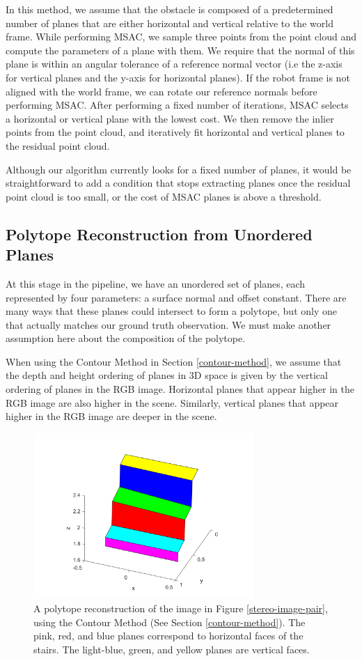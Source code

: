 In this method, we assume that the obstacle is composed of a predetermined number of planes that are either horizontal and vertical relative to the world frame. While performing MSAC, we sample three points from the point cloud and compute the parameters of a plane with them. We require that the normal of this plane is within an angular tolerance of a reference normal vector (i.e the z-axis for vertical planes and the y-axis for horizontal planes). If the robot frame is not aligned with the world frame, we can rotate our reference normals before performing MSAC. After performing a fixed number of iterations, MSAC selects a horizontal or vertical plane with the lowest cost. We then remove the inlier points from the point cloud, and iteratively fit horizontal and vertical planes to the residual point cloud.

Although our algorithm currently looks for a fixed number of planes, it would be straightforward to add a condition that stops extracting planes once the residual point cloud is too small, or the cost of MSAC planes is above a threshold.

\subsection{Polytope Reconstruction from Unordered Planes} \label{polytope-section}

At this stage in the pipeline, we have an unordered set of planes, each represented by four parameters: a surface normal and offset constant. There are many ways that these planes could intersect to form a polytope, but only one that actually matches our ground truth observation. We must make another assumption here about the composition of the polytope.

When using the Contour Method in Section \ref{contour-method}, we assume that the depth and height ordering of planes in 3D space is given by the vertical ordering of planes in the RGB image. Horizontal planes that appear higher in the RGB image are also higher in the scene. Similarly, vertical planes that appear higher in the RGB image are deeper in the scene.

\begin{figure}[!h]
\centering
\includegraphics[width=3.3in]{Sections/Figures/polytope_example.png}
\caption{A polytope reconstruction of the image in Figure \ref{stereo-image-pair}, using the Contour Method (See Section \ref{contour-method}). The pink, red, and blue planes correspond to horizontal faces of the stairs. The light-blue, green, and yellow planes are vertical faces.}
\label{polytope-diagonal-contour}
\end{figure}

